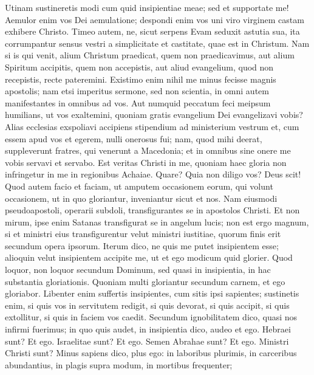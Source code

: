 \begin{biblechapter}
\begin{biblechapter}
\begin{biblechapter}
\begin{biblechapter}
\begin{biblechapter}
\begin{biblechapter}
\begin{biblechapter}
\begin{biblechapter}
\begin{biblechapter}
\begin{biblechapter}
\begin{biblechapter}
\verse Utinam sustineretis modi cum quid insipientiae meae; sed et supportate me! 
\verse Aemulor enim vos Dei aemulatione; despondi enim vos uni viro virginem castam exhibere Christo. 
\verse Timeo autem, ne, sicut serpens Evam seduxit astutia sua, ita corrumpantur sensus vestri a simplicitate et castitate, quae est in Christum. 
\verse Nam si is qui venit, alium Christum praedicat, quem non praedicavimus, aut alium Spiritum accipitis, quem non accepistis, aut aliud evangelium, quod non recepistis, recte pateremini. 
\verse Existimo enim nihil me minus fecisse magnis apostolis; 
\verse nam etsi imperitus sermone, sed non scientia, in omni autem manifestantes in omnibus ad vos.
 \verse Aut numquid peccatum feci meipsum humilians, ut vos exaltemini, quoniam gratis evangelium Dei evangelizavi vobis? 
\verse Alias ecclesias exspoliavi accipiens stipendium ad ministerium vestrum 
\verse et, cum essem apud vos et egerem, nulli onerosus fui; nam, quod mihi deerat, suppleverunt fratres, qui venerunt a Macedonia; et in omnibus sine onere me vobis servavi et servabo. 
\verse Est veritas Christi in me, quoniam haec gloria non infringetur in me in regionibus Achaiae.
 \verse Quare? Quia non diligo vos? Deus scit! 
\verse Quod autem facio et faciam, ut amputem occasionem eorum, qui volunt occasionem, ut in quo gloriantur, inveniantur sicut et nos. 
\verse Nam eiusmodi pseudoapostoli, operarii subdoli, transfigurantes se in apostolos Christi. 
\verse Et non mirum, ipse enim Satanas transfigurat se in angelum lucis; 
\verse non est ergo magnum, si et ministri eius transfigurentur velut ministri iustitiae, quorum finis erit secundum opera ipsorum.
 \verse Iterum dico, ne quis me putet insipientem esse; alioquin velut insipientem accipite me, ut et ego modicum quid glorier. 
\verse Quod loquor, non loquor secundum Dominum, sed quasi in insipientia, in hac substantia gloriationis. 
 \verse Quoniam multi gloriantur secundum carnem, et ego gloriabor. 
\verse Libenter enim suffertis insipientes, cum sitis ipsi sapientes; 
\verse sustinetis enim, si quis vos in servitutem redigit, si quis devorat, si quis accipit, si quis extollitur, si quis in faciem vos caedit.
 \verse Secundum ignobilitatem dico, quasi nos infirmi fuerimus; in quo quis audet, in insipientia dico, audeo et ego. 
\verse Hebraei sunt? Et ego. Israelitae sunt? Et ego. Semen Abrahae sunt? Et ego. 
\verse Ministri Christi sunt? Minus sapiens dico, plus ego: in laboribus plurimis, in carceribus abundantius, in plagis supra modum, in mortibus frequenter; 

\end{biblechapter}
\end{biblechapter}
\end{biblechapter}
\end{biblechapter}
\end{biblechapter}
\end{biblechapter}
\end{biblechapter}
\end{biblechapter}
\end{biblechapter}
\end{biblechapter}
\end{biblechapter}
